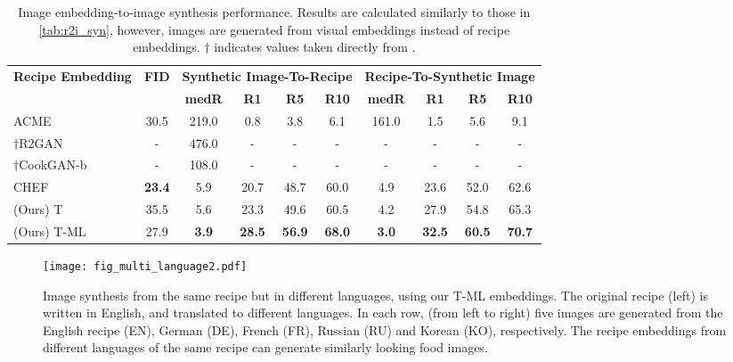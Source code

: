 \documentclass[sigconf,nonacm]{acmart}
\begin{document}
\begin{table*}[!ht]
  \centering
  \small
  \caption{Image embedding-to-image synthesis performance. 
Results
  are calculated similarly to those in \autoref{tab:r2i_syn}, however, images are generated from visual embeddings instead of recipe embeddings. $\dagger$ indicates values taken directly from \cite{zhu2020}.}\begin{tabular}{l|c|cccc|cccc}
    \toprule
    \multicolumn{1}{c|}{\multirow{2}[4]{*}{\textbf{Recipe Embedding}}} & \multirow{2}[4]{*}{\textbf{FID} } & \multicolumn{4}{c|}{\textbf{Synthetic Image-To-Recipe}} & \multicolumn{4}{c}{\textbf{Recipe-To-Synthetic Image}} \\
\cmidrule{3-10}           &        & \textbf{medR}   & \textbf{R1}   & \textbf{R5}    & \textbf{R10}  & \textbf{medR}   & \textbf{R1}    & \textbf{R5}    & \textbf{R10}  \\
    \midrule
    ACME~\cite{wang2019} & 30.5 & 219.0  & 0.8    & 3.8    & 6.1    & 161.0  & 1.5    & 5.6    & 9.1 \\
    $\dagger$R2GAN~\cite{Zhu2019} & - & 476.0  & -    & -    & -    & -  & -    & -    & - \\
    $\dagger$CookGAN-b~\cite{zhu2020} & - & 108.0  & -    & -    & -    & -  & -    & -    & - \\
    CHEF~\cite{chef2021} & \textbf{23.4}  & 5.9    & 20.7   & 48.7   & 60.0   & 4.9    & 23.6   & 52.0   & 62.6 \\
    (Ours) T & 35.5 & 5.6    & 23.3   & 49.6   & 60.5   & 4.2    & 27.9   & 54.8   & 65.3 \\
    (Ours) T-ML & 27.9 & \textbf{3.9} & \textbf{28.5} & \textbf{56.9} & \textbf{68.0} & \textbf{3.0} & \textbf{32.5} & \textbf{60.5} & \textbf{70.7} \\
    \bottomrule
    \end{tabular}\label{tab:i2i_syn}\end{table*}

\begin{figure*}[!ht]
\centering
\texttt{[image: fig\_multi\_language2.pdf]}
\caption{Image synthesis from the same recipe but in different languages, using our T-ML embeddings. The original recipe (left) is written in English, and translated to different languages. In each row, (from left to right) five images are generated from the English recipe (EN), German (DE), French (FR), Russian (RU) and Korean (KO), respectively. The recipe embeddings from different languages of the same recipe can generate similarly looking food images.}
\label{fig:syn_multi_lang}
\end{figure*}
\end{document}
